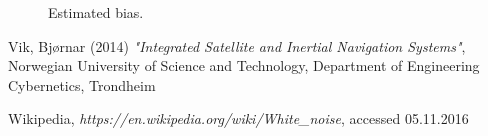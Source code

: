 \documentclass{article}
\begin{document}
\begin{figure}[!ht]
    \centering
    \caption{Estimated bias.}
\end{figure}
	

\newpage
{}
\begin{thebibliography}{25}

	Vik, Bjørnar (2014)
	\emph{"Integrated Satellite and Inertial Navigation Systems"},
	Norwegian University of Science and Technology, Department of Engineering Cybernetics, Trondheim
	
	Wikipedia,
	\emph{https://en.wikipedia.org/wiki/White\_noise},
	accessed 05.11.2016
	
\end{thebibliography}
\end{document}
